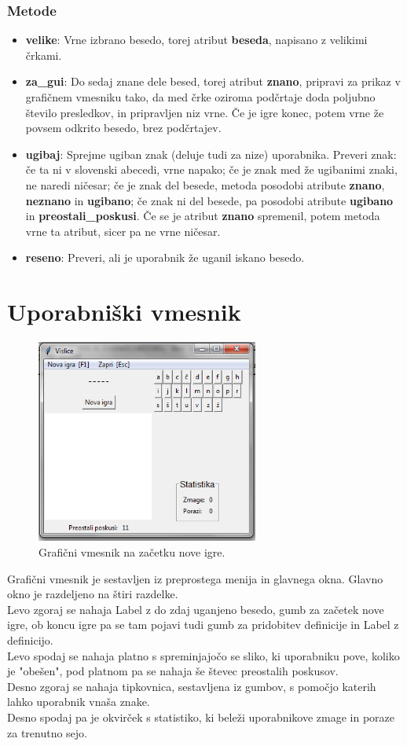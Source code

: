 \documentclass [a4paper, 12pt] {article}
\begin{document}
\subsubsection {Metode}
\begin {itemize}
\item \textbf {velike}: Vrne izbrano besedo, torej atribut \textbf {beseda}, napisano z velikimi črkami.
\item \textbf {za\_gui}: Do sedaj znane dele besed, torej atribut \textbf {znano}, pripravi za prikaz v grafičnem vmesniku tako, da med črke oziroma podčrtaje doda poljubno število presledkov, in pripravljen niz vrne. Če je igre konec, potem vrne že povsem odkrito besedo, brez podčrtajev. 
\item \textbf{ugibaj}: Sprejme ugiban znak (deluje tudi za nize) uporabnika. Preveri znak: če ta ni v slovenski abecedi, vrne napako; če je znak med že ugibanimi znaki, ne naredi ničesar; če je znak del besede, metoda posodobi atribute \textbf {znano}, \textbf {neznano} in \textbf {ugibano}; če znak ni del besede, pa posodobi atribute \textbf {ugibano} in \textbf {preostali\_poskusi}. Če se je atribut \textbf {znano} spremenil, potem metoda vrne ta atribut, sicer pa ne vrne ničesar. 
\item \textbf{reseno}: Preveri, ali je uporabnik že uganil iskano besedo.
\end {itemize}

\section {Uporabniški vmesnik}
\begin {figure} [h]
\centering
\includegraphics [height=190pt] {slike/za_porocilo_gui.png}
\caption {Grafični vmesnik na začetku nove igre.}
\end {figure}
\noindent Grafični vmesnik je sestavljen iz preprostega menija in glavnega okna.  Glavno okno je razdeljeno na štiri razdelke. \\
Levo zgoraj se nahaja Label z do zdaj uganjeno besedo, gumb za začetek nove igre, ob koncu igre pa se tam pojavi tudi gumb za pridobitev definicije in Label z definicijo. \\
Levo spodaj se nahaja platno s spreminjajočo se sliko, ki uporabniku pove, koliko je "obešen", pod platnom pa se nahaja še števec preostalih poskusov.  \\
Desno zgoraj se nahaja tipkovnica, sestavljena iz gumbov, s pomočjo katerih lahko uporabnik vnaša znake. \\
Desno spodaj pa je okvirček s statistiko, ki beleži uporabnikove zmage in poraze za trenutno sejo. 
\end{document}

